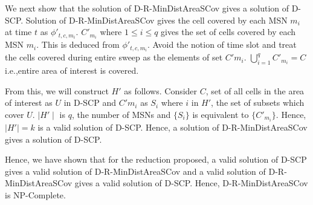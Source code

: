We next show that the solution of D-R-MinDistAreaSCov gives a solution of D-SCP.  Solution of D-R-MinDistAreaSCov gives the cell covered by each MSN $m_i$ at time $t$ as $\phi{'}_{t,c,m_i}$. $C'_{m_i}$ where $1 \leq i \leq q$ gives the set of cells covered by each MSN $m_i$. This is deduced from $\phi{'}_{t,c,m_i}$. Avoid the notion of time slot and treat the cells covered during entire sweep as the elements of set $C'{m_i}$.  $\bigcup_{i=1}^{q} C'_{m_i} = C$ i.e.,entire area of interest is covered.

From this, we will construct $H'$ as follows. Consider $C$, set of all cells in the area of interest as $U$ in D-SCP and $C'{m_i}$ as $S_i$ where $i$ in  $H'$, the set of subsets which cover $U$. $\mid H' \mid$ is $q$, the number of MSNs and $\{S_i\}$ is equivalent to $\{C'_{m_i} \}$. Hence,  $\mid H' \mid = k$ is a valid solution of D-SCP. Hence, a solution of D-R-MinDistAreaSCov gives a solution of D-SCP.

Hence, we have shown that for the reduction proposed, a valid solution of D-SCP gives a valid solution of 
D-R-MinDistAreaSCov and a valid solution of D-R-MinDistAreaSCov gives a valid solution of D-SCP. Hence, D-R-MinDistAreaSCov is NP-Complete.


